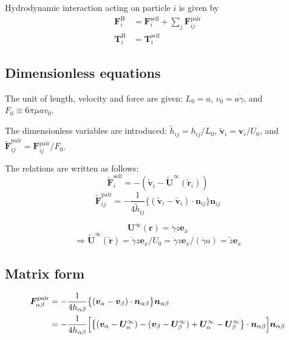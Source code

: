 \documentclass[12pt]{article}
\begin{document}
Hydrodynamic interaction acting on particle $i$
is given by
\begin{align}
\bm{F}_i^{\mathrm{H}}
&=
\bm{F}_i^{\mathrm{self}}
+
\sum_j
\bm{F}_{ij}^{\mathrm{pair}} \\
\bm{T}_i^{\mathrm{H}}
&=
\bm{T}_i^{\mathrm{self}}
\end{align}




\newpage
\subsection*{Dimensionless equations}

The unit of length, velocity and force 
are given:
$L_0 = a$,  $v_0 = a \dot{\gamma}$, and $F_0 \equiv 6 \pi \mu a v_0$.

The dimensionless variables are introduced:
$\tilde{h}_{ij} = h_{ij} / L_0$,
$\tilde{\bm{v}}_i = \bm{v}_i / U_0$,
and $\tilde{\bm{F}}_{ij}^{\mathrm{pair}} = \bm{F}_{ij}^{\mathrm{pair}} / F_0$.

The relations are written as follows:
\begin{equation}
 \tilde{\bm{F}}_i^{\mathrm{self}} = 
-( \tilde{\bm{v}}_i - 
\tilde{\bm{U}}^{\infty} 
(\tilde{\bm{r}}_i) )
\end{equation}
\begin{equation}
 \tilde{\bm{F}}_{ij}^{\mathrm{pair}}
= 
- \frac{1}{4 \tilde{h}_{ij}}
\bigl\{
(\tilde{\bm{v}}_i-
\tilde{\bm{v}}_i)\cdot
\bm{n}_{ij}
\bigr\}\bm{n}_{ij}
\end{equation}

\begin{equation}
 \bm{U}^{\infty}(\bm{r})
 = 
 \dot{\gamma} z \bm{e}_{x}
\end{equation}
\begin{equation}
\Longrightarrow
  \tilde{\bm{U}}^{\infty}(\tilde{\bm{r}})
 = 
 \dot{\gamma} z \bm{e}_{x} / U_0
=  \dot{\gamma} z \bm{e}_{x} / (\dot{\gamma} a)
= \tilde{z} \bm{e}_{x} 
\end{equation}


\newpage
\subsection*{Matrix form}
\begin{align*}
 \bm{F}_{\alpha\beta}^{\mathrm{pair}}
&= 
- \frac{1}{4 h_{\alpha\beta}}
\bigl\{
(\bm{v}_\alpha-
\bm{v}_\beta)\cdot
\bm{n}_{\alpha\beta}
\bigr\}\bm{n}_{\alpha\beta} \\
&=
- \frac{1}{4 h_{\alpha\beta}}
\Bigl[
\bigl\{
(\bm{v}_\alpha- \bm{U}^{\infty}_\alpha)-
(\bm{v}_\beta- \bm{U}^{\infty}_\beta)
+ \bm{U}^{\infty}_\alpha
- \bm{U}^{\infty}_\beta
\bigr\}\cdot
\bm{n}_{\alpha\beta}
\Bigr]
\bm{n}_{\alpha\beta}
\end{align*}
\end{document}
